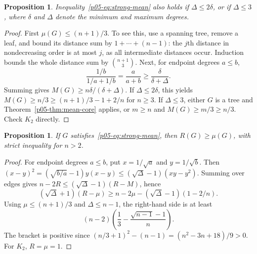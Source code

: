 \documentclass[11pt,a4paper]{article}
\newtheorem{proposition}[theorem]{Proposition}
\begin{document}
\begin{proposition}\label{p05-prop:mean-degree}
Inequality~\eqref{p05-eq:strong-mean} also holds if
$\Delta\le2\delta$, or if $\Delta\le3$, where $\delta$ and $\Delta$
denote the minimum and maximum degrees.
\end{proposition}
\begin{proof}
First $\mu(G)\le(n+1)/3$. To see this, use a spanning tree, remove a
leaf, and bound its distance sum by $1+\cdots+(n-1)$: the $j$th
distance in nondecreasing order is at most $j$, as all intermediate
distances occur. Induction bounds the whole distance sum by
$\binom{n+1}{3}$. Next, for endpoint degrees $a\le b$,
\[
 \frac{1/b}{1/a+1/b}=\frac{a}{a+b}\ge\frac{\delta}{\delta+\Delta}.
\]
Summing gives $M(G)\ge n\delta/(\delta+\Delta)$. If $\Delta\le2\delta$,
this yields $M(G)\ge n/3\ge(n+1)/3-1+2/n$ for $n\ge3$.
If $\Delta\le3$, either $G$ is a tree and Theorem~\ref{p05-thm:mean-core}
applies, or $m\ge n$ and $M(G)\ge m/3\ge n/3$. Check $K_2$ directly.
\end{proof}

\begin{proposition}\label{p05-prop:mean-transfer}
If $G$ satisfies~\eqref{p05-eq:strong-mean}, then $R(G)\ge\mu(G)$,
with strict inequality for $n>2$.
\end{proposition}
\begin{proof}
For endpoint degrees $a\le b$, put $x=1/\sqrt a$ and $y=1/\sqrt b$.
Then
$(x-y)^2=(\sqrt{b/a}-1)y(x-y)\le(\sqrt\Delta-1)(xy-y^2)$.
Summing over edges gives $n-2R\le(\sqrt\Delta-1)(R-M)$, hence
\[
 (\sqrt\Delta+1)(R-\mu)\ge
 n-2\mu-(\sqrt\Delta-1)(1-2/n).
\]
Using $\mu\le(n+1)/3$ and $\Delta\le n-1$, the right-hand side is at least
\[
 (n-2)\left(\frac13-\frac{\sqrt{n-1}-1}{n}\right).
\]
The bracket is positive since $(n/3+1)^2-(n-1)=(n^2-3n+18)/9>0$.
For $K_2$, $R=\mu=1$.
\end{proof}
\end{document}
